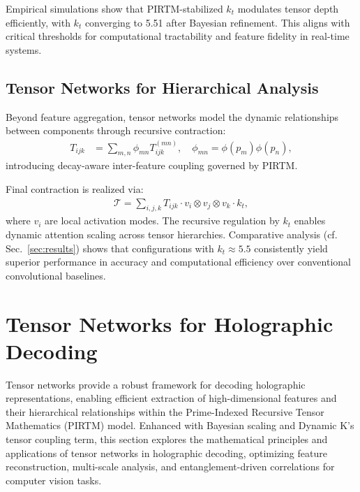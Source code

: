 \documentclass{article}
\theoremstyle{plain}
\begin{document}
Empirical simulations show that PIRTM-stabilized \( k_t \) modulates tensor depth efficiently, with \( k_t \) converging to 5.51 after Bayesian refinement. This aligns with critical thresholds for computational tractability and feature fidelity in real-time systems.

\subsection{Tensor Networks for Hierarchical Analysis}
Beyond feature aggregation, tensor networks model the dynamic relationships between components through recursive contraction:
\begin{align}
T_{ijk} &= \sum_{m,n} \phi_{mn} T_{ijk}^{(mn)}, \quad \phi_{mn} = \phi(p_m) \phi(p_n),
\end{align}
introducing decay-aware inter-feature coupling governed by PIRTM.

Final contraction is realized via:
\begin{align}
\mathcal{T} = \sum_{i,j,k} T_{ijk} \cdot v_i \otimes v_j \otimes v_k \cdot k_t,
\end{align}
where \( v_i \) are local activation modes. The recursive regulation by \( k_t \) enables dynamic attention scaling across tensor hierarchies. Comparative analysis (cf. Sec.~\ref{sec:results}) shows that configurations with \( k_t \approx 5.5 \) consistently yield superior performance in accuracy and computational efficiency over conventional convolutional baselines.
\section{Tensor Networks for Holographic Decoding}
Tensor networks provide a robust framework for decoding holographic representations, enabling efficient extraction of high-dimensional features and their hierarchical relationships within the Prime-Indexed Recursive Tensor Mathematics (PIRTM) model. Enhanced with Bayesian scaling and Dynamic K’s tensor coupling term, this section explores the mathematical principles and applications of tensor networks in holographic decoding, optimizing feature reconstruction, multi-scale analysis, and entanglement-driven correlations for computer vision tasks.
\end{document}
